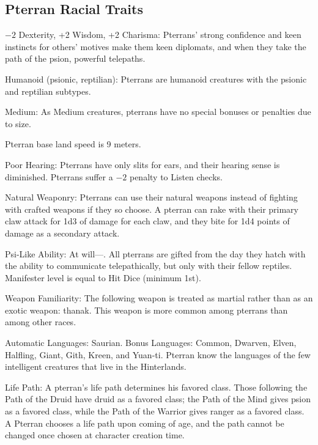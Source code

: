 \subsection{Pterran Racial Traits}
\begin{itemize*}
    \item $-2$ Dexterity, +2 Wisdom, +2 Charisma: Pterrans' strong confidence and keen instincts for others' motives make them keen diplomats, and when they take the path of the psion, powerful telepaths.
    \item Humanoid (psionic, reptilian): Pterrans are humanoid creatures with the psionic and reptilian subtypes.
    \item Medium: As Medium creatures, pterrans have no special bonuses or penalties due to size.
    \item Pterran base land speed is 9 meters.
    \item Poor Hearing: Pterrans have only slits for ears, and their hearing sense is diminished. Pterrans suffer a $-2$ penalty to Listen checks.
    \item Natural Weaponry: Pterrans can use their natural weapons instead of fighting with crafted weapons if they so choose. A pterran can rake with their primary claw attack for 1d3 of damage for each claw, and they bite for 1d4 points of damage as a secondary attack.
    \item Psi-Like Ability: At will---. All pterrans are gifted from the day they hatch with the ability to communicate telepathically, but only with their fellow reptiles. Manifester level is equal to \onehalf Hit Dice (minimum 1st).
    \item Weapon Familiarity: The following weapon is treated as martial rather than as an exotic weapon: thanak. This weapon is more common among pterrans than among other races.
    \item Automatic Languages: Saurian. Bonus Languages: Common, Dwarven, Elven, Halfling, Giant, Gith, Kreen, and Yuan-ti. Pterran know the languages of the few intelligent creatures that live in the Hinterlands.
    \item Life Path: A pterran's life path determines his favored class. Those following the Path of the Druid have druid as a favored class; the Path of the Mind gives psion as a favored class, while the Path of the Warrior gives ranger as a favored class. A Pterran chooses a life path upon coming of age, and the path cannot be changed once chosen at character creation time.
\end{itemize*}